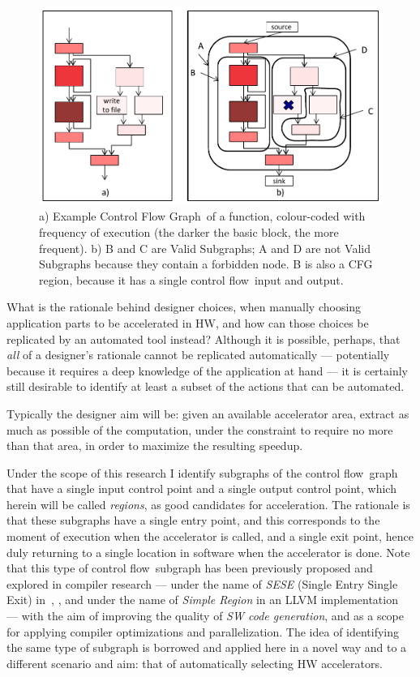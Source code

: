 \documentclass[]{usiinfthesis}
\newcommand{\controlflow}{control flow}
\newcommand{\CFG}{Control Flow Graph}
\begin{document}
\begin{figure}[t]
\centering
\includegraphics[width= .7 \linewidth]{Figs/cfg_example}
\caption{a) Example \CFG\ of a function, colour-coded with frequency
  of execution (the darker the basic block, the more frequent). b) B
  and C are Valid Subgraphs; A and D are not Valid Subgraphs because
  they contain a forbidden node. B is also a CFG region, because it has a
  single \controlflow\ input and output.}
\label{fig:cfg-example}
\end{figure}


What is the rationale behind designer choices, when manually choosing
application parts to be accelerated in HW, and how can those choices
be replicated by an automated tool instead? Although it is possible,
perhaps, that \emph{all} of a designer's rationale cannot be
replicated automatically --- potentially because it requires a deep
knowledge of the application at hand --- it is certainly still
desirable to identify at least a subset of the actions that can be
automated.\par

Typically the designer aim will be: given an available accelerator
area, extract as much as possible of the computation, under the
constraint to require no more than that area, in order to maximize the
resulting speedup.\par 

Under the scope of this research I identify subgraphs of the \controlflow\ 
graph that have a single input control point and a single output control point, 
which herein will be called \emph{regions}, as good candidates for 
acceleration. The rationale
is that these subgraphs have a single entry point, and this
corresponds to the moment of execution when the accelerator is called,
and a single exit point, hence duly returning to a single location in
software when the accelerator is done. Note that this type of
\controlflow\ subgraph has been previously proposed and explored in
compiler research --- under the name of \emph{SESE} (Single Entry
Single Exit) in~\cite{AguilarJune16}, \cite{JohnsonJun94}, and under
the name of \emph{Simple Region} in an LLVM
implementation~\cite{LattnerMar04} --- with the aim of improving the
quality of \emph{SW code generation}, and as a scope for applying
compiler optimizations and parallelization. The idea of
identifying the same type of subgraph is borrowed and applied here in a 
novel way and to a different scenario and aim: that of automatically 
selecting HW accelerators.\par
\end{document}
